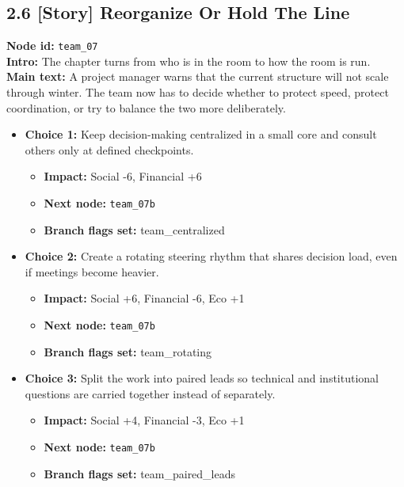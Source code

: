 \documentclass[11pt]{article}
\begin{document}
\subsection*{2.6 [Story] Reorganize Or Hold The Line}
\textbf{Node id:} \texttt{team\_07}\\
\textbf{Intro:} The chapter turns from who is in the room to how the room is run.\\
\textbf{Main text:} A project manager warns that the current structure will not scale through winter. The team now has to decide whether to protect speed, protect coordination, or try to balance the two more deliberately.\\
\begin{itemize}
\item \textbf{Choice 1:} Keep decision-making centralized in a small core and consult others only at defined checkpoints.
\begin{itemize}
\item \textbf{Impact:} Social -6, Financial +6
\item \textbf{Next node:} \texttt{team\_07b}
\item \textbf{Branch flags set:} team\_centralized
\end{itemize}
\item \textbf{Choice 2:} Create a rotating steering rhythm that shares decision load, even if meetings become heavier.
\begin{itemize}
\item \textbf{Impact:} Social +6, Financial -6, Eco +1
\item \textbf{Next node:} \texttt{team\_07b}
\item \textbf{Branch flags set:} team\_rotating
\end{itemize}
\item \textbf{Choice 3:} Split the work into paired leads so technical and institutional questions are carried together instead of separately.
\begin{itemize}
\item \textbf{Impact:} Social +4, Financial -3, Eco +1
\item \textbf{Next node:} \texttt{team\_07b}
\item \textbf{Branch flags set:} team\_paired\_leads
\end{itemize}
\end{itemize}
\end{document}
